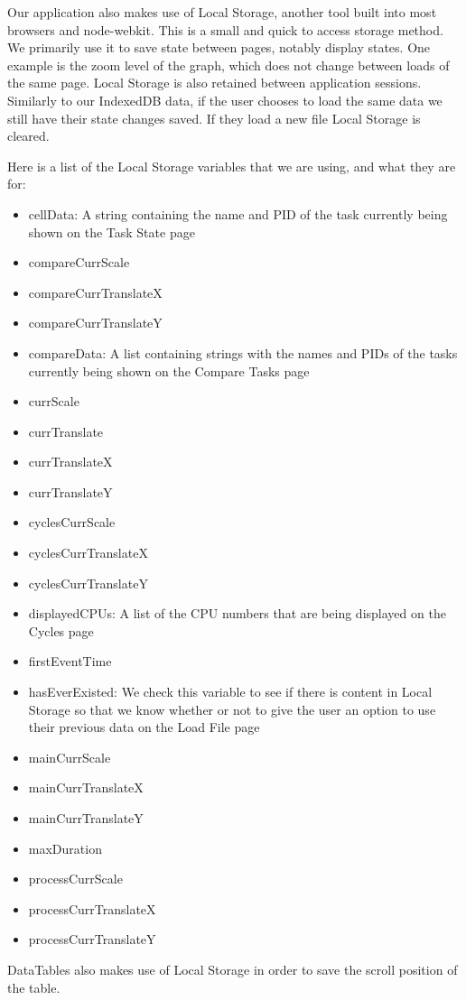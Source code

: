 \documentclass{hmcclinic}
\begin{document}
  Our application also makes use of Local Storage, another tool
  built into most browsers and node-webkit. This is a small and quick to access
  storage method. We primarily use it to save state between pages, notably
  display states. One example is the zoom level of the graph, which does not
  change between loads of the same page. Local Storage is also retained between
  application sessions. Similarly to our IndexedDB data, if the user chooses to
  load the same data we still have their state changes saved. If they load a new
  file Local Storage is cleared.

Here is a list of the Local Storage variables that we are using, and what they are for:
\begin{itemize}
\item cellData: A string containing the name and PID of the task currently being shown on the Task State page 
\item compareCurrScale
\item compareCurrTranslateX		
\item compareCurrTranslateY		
\item compareData: A list containing strings with the names and PIDs of the tasks currently being shown on the  Compare Tasks page
\item currScale	
\item currTranslate	
\item currTranslateX	
\item currTranslateY	
\item cyclesCurrScale	
\item cyclesCurrTranslateX		
\item cyclesCurrTranslateY		
\item displayedCPUs: A list of the CPU numbers that are being displayed on the Cycles page
\item firstEventTime	
\item hasEverExisted: We check this variable to see if there is content in Local Storage so that we know whether or not to give the user an option to use their previous data on the Load File page	
\item mainCurrScale	
\item mainCurrTranslateX	
\item mainCurrTranslateY
\item maxDuration
\item processCurrScale	
\item processCurrTranslateX		
\item processCurrTranslateY		
\end{itemize}
DataTables also makes use of Local Storage in order to save the scroll position of the table.
\end{document}
